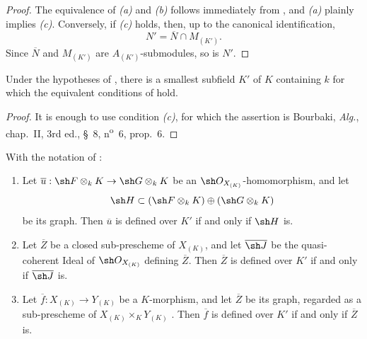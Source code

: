 \begin{proof}
The equivalence of \emph{(a)} and \emph{(b)} follows immediately from
, and \emph{(a)} plainly implies \emph{(c)}.
Conversely, if \emph{(c)} holds, then, up to the canonical
identification,
\[
N'=\overline N\cap M_{(K')}.
\]
Since $\overline N$ and $M_{(K')}$ are $A_{(K')}$-submodules, so is
$N'$.
\end{proof}

\begin{corollary}[4.8.7]
\label{IV.4.8.7}
Under the hypotheses of , there is a smallest subfield
$K'$ of $K$ containing $k$ for which the equivalent conditions of
 hold.
\end{corollary}

\begin{proof}
It is enough to use condition \emph{(c)}, for which the assertion is
Bourbaki, \emph{Alg.}, chap.~II, 3rd ed., \S~8,
n\textsuperscript{o}~6, prop.~6.
\end{proof}

\begin{lemma}[4.8.8]
\label{IV.4.8.8}
With the notation of :
\begin{enumerate}
\item[\rm(i)]
\label{IV.4.8.8.i}
Let
$\overline u:\sh F\otimes_kK\to\sh G\otimes_kK$ be an
$\sh O_{X_{(K)}}$-homomorphism, and let
\[
\sh H\subset
(\sh F\otimes_kK)\oplus(\sh G\otimes_kK)
\]
be its graph.
Then $\overline u$ is defined over $K'$ if and only if $\sh H$ is.

\item[\rm(ii)]
\label{IV.4.8.8.ii}
Let $\overline Z$ be a closed sub-prescheme of $X_{(K)}$, and let
$\overline{\sh J}$ be the quasi-coherent Ideal of
$\sh O_{X_{(K)}}$ defining $\overline Z$.
Then $\overline Z$ is defined over $K'$ if and only if
$\overline{\sh J}$ is.

\item[\rm(iii)]
\label{IV.4.8.8.iii}
Let $\overline f:X_{(K)}\to Y_{(K)}$ be a $K$-morphism, and let
$\overline Z$ be its graph, regarded as a sub-prescheme of
$X_{(K)}\times_KY_{(K)}$ .
Then $\overline f$ is defined over $K'$ if and only if
$\overline Z$ is.
\end{enumerate}
\end{lemma}

